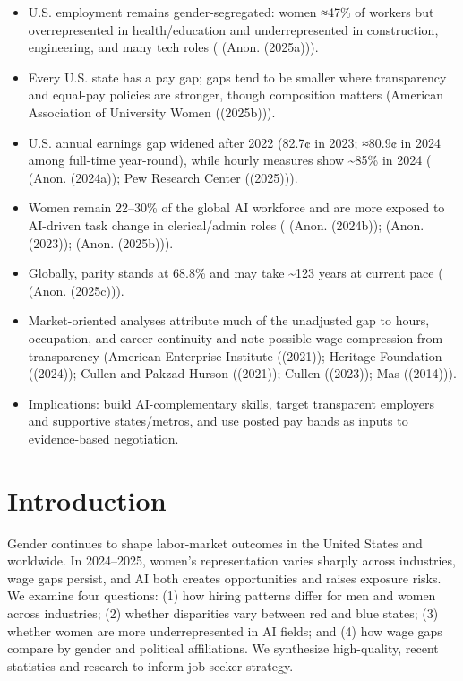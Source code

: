 \documentclass[
  letterpaper,
  DIV=11,
  numbers=noendperiod]{scrartcl}
\providecommand{\tightlist}{%
  \setlength{\itemsep}{0pt}\setlength{\parskip}{0pt}}\usepackage{longtable,booktabs,array}
\begin{document}
\begin{itemize}
\tightlist
\item
  U.S. employment remains gender-segregated: women ≈47\% of workers but
  overrepresented in health/education and underrepresented in
  construction, engineering, and many tech roles ( (Anon. (2025a))).
\item
  Every U.S. state has a pay gap; gaps tend to be smaller where
  transparency and equal-pay policies are stronger, though composition
  matters (American Association of University Women ((2025b))).
\item
  U.S. annual earnings gap widened after 2022 (82.7¢ in 2023; ≈80.9¢ in
  2024 among full-time year-round), while hourly measures show
  \textasciitilde85\% in 2024 ( (Anon. (2024a)); Pew Research Center
  ((2025))).
\item
  Women remain 22--30\% of the global AI workforce and are more exposed
  to AI-driven task change in clerical/admin roles ( (Anon. (2024b));
  (Anon. (2023)); (Anon. (2025b))).
\item
  Globally, parity stands at 68.8\% and may take \textasciitilde123
  years at current pace ( (Anon. (2025c))).
\item
  Market-oriented analyses attribute much of the unadjusted gap to
  hours, occupation, and career continuity and note possible wage
  compression from transparency (American Enterprise Institute ((2021));
  Heritage Foundation ((2024)); Cullen and Pakzad-Hurson ((2021));
  Cullen ((2023)); Mas ((2014))).
\item
  Implications: build AI-complementary skills, target transparent
  employers and supportive states/metros, and use posted pay bands as
  inputs to evidence-based negotiation.
\end{itemize}

\section{Introduction}\label{introduction}

Gender continues to shape labor-market outcomes in the United States and
worldwide. In 2024--2025, women's representation varies sharply across
industries, wage gaps persist, and AI both creates opportunities and
raises exposure risks. We examine four questions: (1) how hiring
patterns differ for men and women across industries; (2) whether
disparities vary between red and blue states; (3) whether women are more
underrepresented in AI fields; and (4) how wage gaps compare by gender
and political affiliations. We synthesize high-quality, recent
statistics and research to inform job-seeker strategy.
\end{document}
